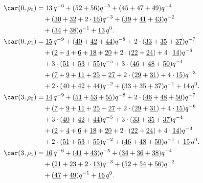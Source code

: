 \begin{align*}
	\car(0,\rho_{0})
	&=\underline{13}\,q^{-6}+(\underline{52}+\underline{56})q^{-5}+(\underline{45}+\underline{47}+\underline{49})q^{-4}\\
	&\quad+(\underline{30}+\underline{32}+2\cdot\underline{16})q^{-3}+(\underline{39}+\underline{41}+\underline{43})q^{-2}\\
	&\quad+(\underline{34}+\underline{38})q^{-1}+\underline{13}\,q^0.\\
	\car(0,\rho_{1})
	&=\underline{15}\,q^{-9}+(\underline{40}+\underline{42}+\underline{44})q^{-8}+2\cdot(\underline{33}+\underline{35}+\underline{37})q^{-7}\\
	&\quad+(\underline{2}+\underline{4}+\underline{6}+\underline{18}+\underline{20}+2\cdot(\underline{22}+\underline{24})+4\cdot\underline{14})q^{-6}\\
	&\quad+3\cdot(\underline{51}+\underline{53}+\underline{55})q^{-5}+3\cdot(\underline{46}+\underline{48}+\underline{50})q^{-4}\\
	&\quad+(\underline{7}+\underline{9}+\underline{11}+\underline{25}+\underline{27}+2\cdot(\underline{29}+\underline{31})+4\cdot\underline{15})q^{-3}\\
	&\quad+2\cdot(\underline{40}+\underline{42}+\underline{44})q^{-2}+(\underline{33}+\underline{35}+\underline{37})q^{-1}+\underline{14}\,q^0.\\
	\car(3,\rho_{0})
	&=\underline{14}\,q^{-9}+(\underline{51}+\underline{53}+\underline{55})q^{-8}+2\cdot(\underline{46}+\underline{48}+\underline{50})q^{-7}\\
	&\quad+(\underline{7}+\underline{9}+\underline{11}+\underline{25}+\underline{27}+2\cdot(\underline{29}+\underline{31})+4\cdot\underline{15})q^{-6}\\
	&\quad+3\cdot(\underline{40}+\underline{42}+\underline{44})q^{-5}+3\cdot(\underline{33}+\underline{35}+\underline{37})q^{-4}\\
	&\quad+(\underline{2}+\underline{4}+\underline{6}+\underline{18}+\underline{20}+2\cdot(\underline{22}+\underline{24})+4\cdot\underline{14})q^{-3}\\
	&\quad+2\cdot(\underline{51}+\underline{53}+\underline{55})q^{-2}+(\underline{46}+\underline{48}+\underline{50})q^{-1}+\underline{15}\,q^0.\\
	\car(3,\rho_{1})
	&=\underline{16}\,q^{-6}+(\underline{41}+\underline{43})q^{-5}+(\underline{34}+\underline{36}+\underline{38})q^{-4}\\
	&\quad+(\underline{21}+\underline{23}+2\cdot\underline{13})q^{-3}+(\underline{52}+\underline{54}+\underline{56})q^{-2}\\
	&\quad+(\underline{47}+\underline{49})q^{-1}+\underline{16}\,q^0.
\end{align*}

